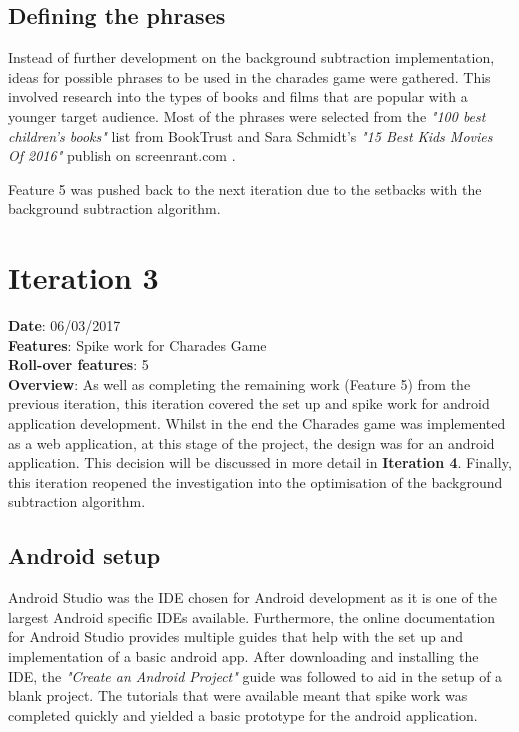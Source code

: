 \subsection{Defining the phrases}
Instead of further development on the background subtraction implementation, ideas for possible phrases to be used in the charades game were gathered. This involved research into the types of books and films that are popular with a younger target audience. Most of the phrases were selected from the \textit{"100 best children's books"} list from BookTrust \cite{book_trust} and Sara Schmidt's \textit{"15 Best Kids Movies Of 2016"} publish on screenrant.com \cite{movies_2016}.

Feature 5 was pushed back to the next iteration due to the setbacks with the background subtraction algorithm.

\newpage

\section{Iteration 3}
\textbf{Date}: 06/03/2017 \\
\textbf{Features}: Spike work for Charades Game \\
\textbf{Roll-over features}: 5 \\
\textbf{Overview}: As well as completing the remaining work (Feature 5) from the previous iteration, this iteration covered the set up and spike work for android application development. Whilst in the end the Charades game was implemented as a web application, at this stage of the project, the design was for an android application. This decision will be discussed in more detail in \textbf{Iteration 4}. Finally, this iteration reopened the investigation into the optimisation of the background subtraction algorithm.

\subsection{Android setup}
Android Studio was the IDE chosen for Android development as it is one of the largest Android specific IDEs available. Furthermore, the online documentation for Android Studio provides multiple guides that help with the set up and implementation of a basic android app. After downloading and installing the IDE, the \textit{"Create an Android Project"} guide \cite{create_android_project} was followed to aid in the setup of a blank project. The tutorials that were available meant that spike work was completed quickly and yielded a basic prototype for the android application.

